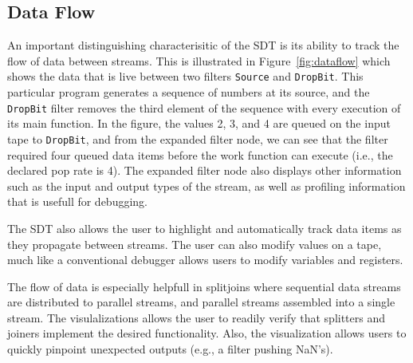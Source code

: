 \documentclass[11pt, letterpaper, onecolumn]{article}
\begin{document}

\subsection{Data Flow}


An important distinguishing characterisitic  of the SDT is its ability
to track  the flow  of data between  streams.  This is  illustrated in
Figure~\ref{fig:dataflow} which  shows the  data that is  live between
two  filters  \texttt{Source}  and \texttt{DropBit}.  This  particular
program  generates  a sequence  of  numbers  at  its source,  and  the
\texttt{DropBit} filter removes the third element of the sequence with
every execution of its main function.  In the figure, the values 2, 3,
and 4 are  queued on the input tape to  \texttt{DropBit}, and from the
expanded filter node, we can  see that the filter required four queued
data items  before the work  function can execute (i.e.,  the declared
pop rate is 4). The expanded filter node also displays other
information such as the input and output types of the stream, as well
as profiling information that is usefull for debugging.

The SDT also allows the user to highlight and automatically track data
items as  they propagate  between streams.  The  user can  also modify
values on  a tape, much like  a conventional debugger  allows users to
modify variables and registers.

The flow of data is especially helpfull in splitjoins where sequential
data streams are distributed to parallel streams, and parallel streams
assembled into a single stream. The visulalizations allows the user to
readily  verify  that  splitters  and joiners  implement  the  desired
functionality.  Also,  the   visualization  allows  users  to  quickly
pinpoint unexpected outputs (e.g., a filter pushing NaN's).

\end{document}
